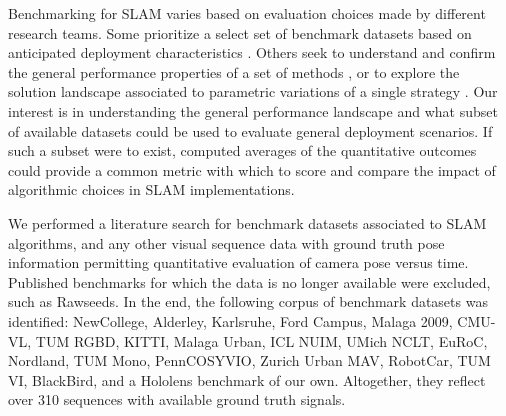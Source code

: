 
Benchmarking for SLAM varies based on evaluation choices made by different
research teams. Some prioritize a select set of benchmark datasets based on
anticipated deployment characteristics \cite{delmerico2018benchmark}. 
Others seek to understand and confirm the general performance properties of
a set of methods \cite{li2016experimental}, or to explore the solution
landscape associated to parametric variations of a single strategy
\cite{nardi2015introducing}. Our interest is in understanding the general
performance landscape and what subset of available datasets could be used
to evaluate general deployment scenarios. If such a subset were to exist,
computed averages of the quantitative outcomes could provide a common
metric with which to score and compare the impact of algorithmic choices in
SLAM implementations.


We performed a literature search for benchmark datasets associated to SLAM
algorithms, and any other visual sequence data with ground truth pose
information permitting quantitative evaluation of camera pose versus time.
Published benchmarks for which the data is no longer
available were excluded, such as Rawseeds\cite{fontana2014rawseeds}.
In the end, the following corpus of benchmark datasets was identified:  
NewCollege\cite{smith2009new},				%
Alderley\cite{milford2012seqslam},			%
Karlsruhe\cite{Geiger2010ACCV}, 			%
Ford Campus\cite{pandey2011ford},			%
Malaga 2009\cite{malaga2009},				%
CMU-VL\cite{badino2011visual}, 			%
TUM RGBD\cite{sturm12iros_ws}, 				%
KITTI\cite{KITTI}, 							%
Malaga Urban\cite{blanco2014malaga},		%
ICL NUIM\cite{ICLNUIM}, 					%
UMich NCLT\cite{carlevaris2016university},	%
EuRoC\cite{burri2016euroc},				%
Nordland\cite{sunderhauf2013we},			%
TUM Mono\cite{engel2016monodataset},		%
PennCOSYVIO\cite{pfrommer2017penncosyvio}, %
Zurich Urban MAV\cite{majdik2017zurich}, 	%
RobotCar\cite{maddern20171},				%
TUM VI\cite{schubert2018vidataset},		%
BlackBird\cite{antonini2018blackbird}, 	%
and a Hololens benchmark of our own. 		%
Altogether, they
reflect over 310 sequences with available ground truth signals.

